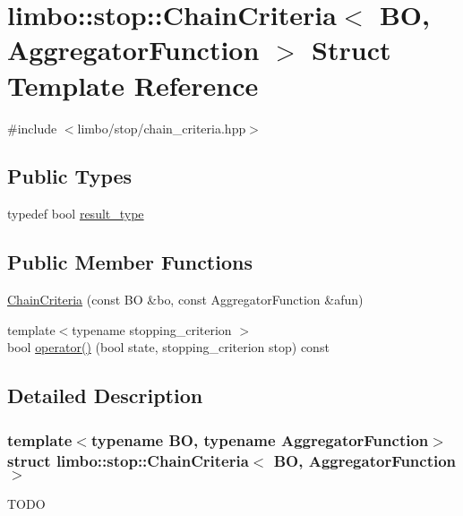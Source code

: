 \hypertarget{structlimbo_1_1stop_1_1_chain_criteria}{}\section{limbo\+:\+:stop\+:\+:Chain\+Criteria$<$ B\+O, Aggregator\+Function $>$ Struct Template Reference}
\label{structlimbo_1_1stop_1_1_chain_criteria}


{\ttfamily \#include $<$limbo/stop/chain\+\_\+criteria.\+hpp$>$}

\subsection*{Public Types}
\begin{DoxyCompactItemize}
\item 
typedef bool \hyperlink{structlimbo_1_1stop_1_1_chain_criteria_a2b3c7f6d2309ff6dd4e67fb28302a7e4}{result\+\_\+type}
\end{DoxyCompactItemize}
\subsection*{Public Member Functions}
\begin{DoxyCompactItemize}
\item 
\hyperlink{structlimbo_1_1stop_1_1_chain_criteria_a287a286866f5ddc83432f23dc1c7c63d}{Chain\+Criteria} (const B\+O \&bo, const Aggregator\+Function \&afun)
\item 
{\footnotesize template$<$typename stopping\+\_\+criterion $>$ }\\bool \hyperlink{structlimbo_1_1stop_1_1_chain_criteria_a1d95f89ebcc61121482a372d37c3a62f}{operator()} (bool state, stopping\+\_\+criterion stop) const 
\end{DoxyCompactItemize}


\subsection{Detailed Description}
\subsubsection*{template$<$typename B\+O, typename Aggregator\+Function$>$struct limbo\+::stop\+::\+Chain\+Criteria$<$ B\+O, Aggregator\+Function $>$}

T\+O\+D\+O 

